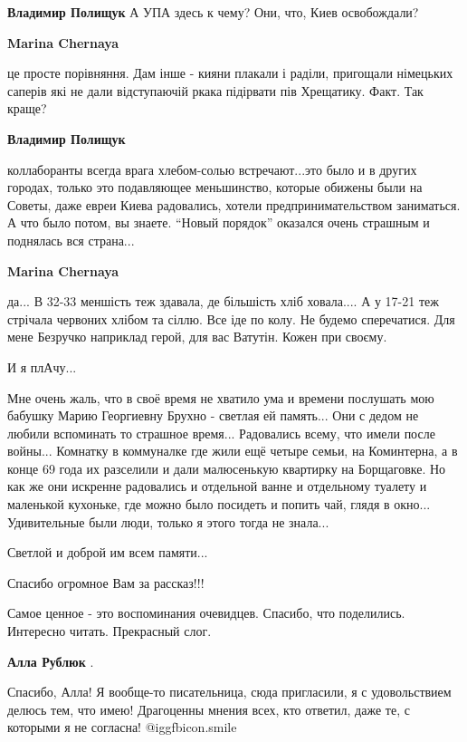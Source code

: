 \begin{itemize}
\begin{itemize} %
\textbf{Владимир Полищук} А УПА здесь к чему? Они, что, Киев освобождали?

\textbf{Marina Chernaya} 

це просте порівняння. Дам інше - кияни плакали і раділи, пригощали німецьких
саперів які не дали відступаючій ркака підірвати пів Хрещатику. Факт. Так
краще?

\textbf{Владимир Полищук} 

коллаборанты всегда врага хлебом-солью встречают...это было и в других городах,
только это подавляющее меньшинство, которые обижены были на Советы, даже евреи
Киева радовались, хотели предпринимательством заниматься. А что было потом, вы
знаете. \enquote{Новый порядок} оказался очень страшным и поднялась вся страна...

\textbf{Marina Chernaya} 

да... В 32-33 меншість теж здавала, де більшість хліб ховала.... А у 17-21 теж
стрічала червоних хлібом та сіллю. Все іде по колу. Не будемо сперечатися. Для
мене Безручко наприклад герой, для вас Ватутін. Кожен при своєму.

\end{itemize} %

И я плАчу...

Мне очень жаль, что в своё время не хватило ума и времени послушать мою бабушку
Марию Георгиевну Брухно - светлая ей память... Они с дедом не любили вспоминать
то страшное время... Радовались всему, что имели после войны... Комнатку в
коммуналке где жили ещё четыре семьи, на Коминтерна, а в конце 69 года их
разселили и дали малюсенькую квартирку на Борщаговке. Но как же они искренне
радовались и отдельной ванне и отдельному туалету и маленькой кухоньке, где
можно было посидеть и попить чай, глядя в окно... Удивительные были люди,
только я этого тогда не знала...

Светлой и доброй им всем памяти...

Спасибо огромное Вам за рассказ!!!

Самое ценное - это воспоминания очевидцев. Спасибо, что поделились. Интересно читать. Прекрасный слог.

\textbf{Алла Рублюк} . 

Спасибо, Алла! Я вообще-то писательница, сюда пригласили, я с удовольствием
делюсь тем, что имею! Драгоценны мнения всех, кто ответил, даже те, с которыми
я не согласна!  @igg{fbicon.smile} 


\end{itemize}
